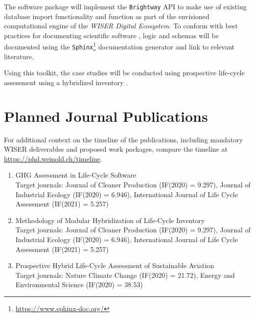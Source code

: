 \documentclass{article}
\begin{document}
    The software package will implement the \texttt{Brightway} API to make use of existing database import functionality and function as part of the envisioned computational engine of the \textit{WISER Digital Ecosystem}. To conform with best practices for documenting scientific software \cite{lee_ten_2018}, logic and schemas will be documented using the \texttt{Sphinx}\footnote{\url{https://www.sphinx-doc.org/}} documentation generator and link to relevant literature.
    
    Using this toolkit, the case studies will be conducted using prospective \cite{sacchi_prospective_2022} life-cycle assessment using a hybridized inventory \cite{crawford_hybrid_2018}.


\section{Planned Journal Publications}

    For additional context on the timeline of the publications, including mandatory WISER deliverables and proposed work packages, compare the timeline at \url{https://phd.weinold.ch/timeline}.
    
    \begin{enumerate}
    \setcounter{enumi}{0}
        \item GHG Assessment in Life-Cycle Software \\ Target journals: Journal of Cleaner Production (IF(2020) = 9.297), Journal of Industrial Ecology (IF(2020) = 6.946), International Journal of Life Cycle Assessment (IF(2021) = 5.257)
    \end{enumerate}
    
    \begin{enumerate}
    \setcounter{enumi}{1}
        \item Methodology of Modular Hybridization of Life-Cycle Inventory \\ Target journals: Journal of Cleaner Production (IF(2020) = 9.297), Journal of Industrial Ecology (IF(2020) = 6.946), International Journal of Life Cycle Assessment (IF(2021) = 5.257)
    \end{enumerate}
    
    \begin{enumerate}
    \setcounter{enumi}{2}
        \item Prospective Hybrid Life-Cycle Assessment of Sustainable Aviation \\ Target journals: Nature Climate Change (IF(2020) = 21.72), Energy and Environmental Science (IF(2020) = 38.53)
    \end{enumerate}
    
\end{document}
